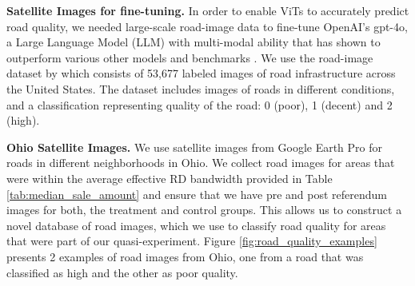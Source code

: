 
{\bf Satellite Images for fine-tuning.} In order to enable ViTs to accurately predict road quality, we needed large-scale road-image data to fine-tune OpenAI's gpt-4o, a Large Language Model (LLM) with multi-modal ability that has shown to outperform various other models and benchmarks \citep{achiam2023gpt}. We use the road-image dataset by \cite{brewer2021} which consists of 53,677 labeled images of road infrastructure across the United States. The dataset includes images of roads in different conditions, and a classification representing quality of the road: 0 (poor), 1 (decent) and 2 (high). 

{\bf Ohio Satellite Images.} We use satellite images from Google Earth Pro for roads in different neighborhoods in Ohio. We collect road images for areas that were within the average effective RD bandwidth provided in Table \ref{tab:median_sale_amount} and ensure that we have pre and post referendum images for both, the treatment and control groups. This allows us to construct a novel database of road images, which we use to classify road quality for areas that were part of our quasi-experiment. Figure \ref{fig:road_quality_examples} presents 2 examples of road images from Ohio, one from a road that was classified as high and the other as poor quality.

